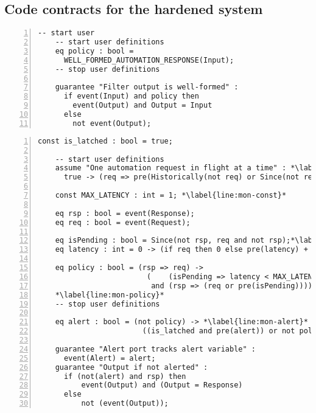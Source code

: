 \subsection{Code contracts for the hardened system}

\newsavebox{\flt}
\begin{lrbox}{\flt}
  \begin{lstlisting}[style=agree,numbers=left] -- start user
    -- start user definitions
    eq policy : bool =
      WELL_FORMED_AUTOMATION_RESPONSE(Input);
    -- stop user definitions

    guarantee "Filter output is well-formed" :
      if event(Input) and policy then
        event(Output) and Output = Input
      else
        not event(Output);
  \end{lstlisting}
\end{lrbox}

\newsavebox{\mntr}
\begin{lrbox}{\mntr}
  \begin{lstlisting}[style=agree,numbers=left]
    const is_latched : bool = true;

    -- start user definitions
    assume "One automation request in flight at a time" : *\label{line:mon-assume}*
      true -> (req => pre(Historically(not req) or Since(not req, rsp)));

    const MAX_LATENCY : int = 1; *\label{line:mon-const}*

    eq rsp : bool = event(Response);
    eq req : bool = event(Request);

    eq isPending : bool = Since(not rsp, req and not rsp);*\label{line:mon-pending}*
    eq latency : int = 0 -> (if req then 0 else pre(latency) + 1);*\label{line:mon-latency}*

    eq policy : bool = (rsp => req) ->
                         (    (isPending => latency < MAX_LATENCY)
                          and (rsp => (req or pre(isPending))));
    *\label{line:mon-policy}*
    -- stop user definitions

    eq alert : bool = (not policy) -> *\label{line:mon-alert}*
                        ((is_latched and pre(alert)) or not policy);

    guarantee "Alert port tracks alert variable" :
      event(Alert) = alert;
    guarantee "Output if not alerted" :
      if (not(alert) and rsp) then
          event(Output) and (Output = Response)
      else
          not (event(Output));
  \end{lstlisting}
\end{lrbox}

